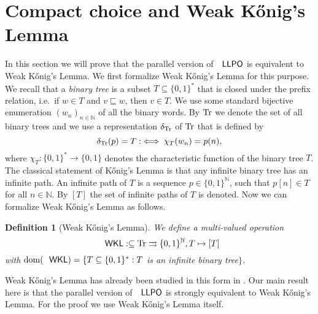 \documentclass[jsl,10pt]{noasl}
\def\IN{{\mathbb{N}}}
\def\In{\subseteq}
\def\prefix{\sqsubseteq}
\def\mto{\rightrightarrows}
\def\dom{{\rm dom}}
\def\Tr{{\rm Tr}}
\def\LLPO{\text{\rm\sffamily LLPO}}
\def\WKL{\text{\rm\sffamily WKL}}
\def\LLPO{\text{\rm\sffamily LLPO}}
\newtheorem{definition}[proposition]{Definition}
\begin{document}
\section{Compact choice and Weak K\H{o}nig's Lemma}
\label{sec:WKL}

In this section we will prove that the parallel version of $\LLPO$ is equivalent
to Weak K\H{o}nig's Lemma. We first formalize Weak K\H{o}nig's Lemma
for this purpose. We recall that a {\em binary tree} is a subset $T\In\{0,1\}^*$ that
is closed under the prefix relation, i.e.\ if $w\in T$ and $v\prefix w$, then $v\in T$. 
We use some standard bijective enumeration $(w_n)_{n\in\IN}$ of all the binary words.
By $\Tr$ we denote the set of all binary trees and we use a representation $\delta_\Tr$ of $\Tr$
that is defined by
\[\delta_{\Tr}(p)=T:\iff\chi_T(w_n)=p(n),\]
where $\chi_T:\{0,1\}^*\to\{0,1\}$ denotes the characteristic function of the binary tree $T$.
The classical statement of K\H{o}nig's Lemma is that any infinite binary tree has 
an infinite path. An infinite path of $T$ is a sequence $p\in\{0,1\}^\IN$, such that 
$p[n]\in T$ for all $n\in\IN$. 
By $[T]$ the set of infinite paths of $T$ is denoted.
Now we can formalize Weak K\H{o}nig's Lemma as follows.

\begin{definition}[Weak K\H{o}nig's Lemma]\rm
We define a multi-valued operation 
\[\WKL:\In\Tr\mto\{0,1\}^\IN,T\mapsto[T]\]
with $\dom(\WKL)=\{T\In\{0,1\}^*:T$ is an infinite binary tree$\}$.
\end{definition}

Weak K\H{o}nig's Lemma has already been studied in this form in \cite{GM09}. Our main result
here is that the parallel version of $\LLPO$ is strongly equivalent to Weak K\H{o}nig's Lemma.
For the proof we use Weak K\H{o}nig's Lemma itself.
\end{document}
